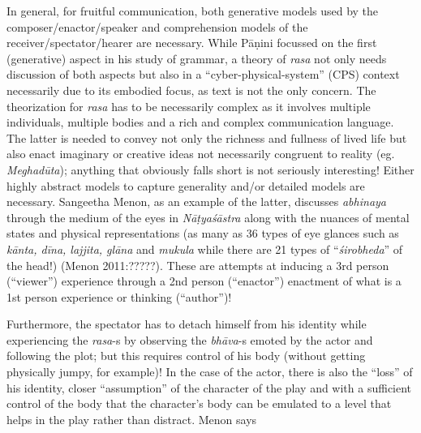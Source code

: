 In general, for fruitful communication, both generative models used by the composer/enactor/speaker and comprehension models of the receiver/spectator/hearer are necessary. While Pāṇini focussed on the first (generative) aspect in his study of grammar, a theory of \textsl{rasa} not only needs discussion of both aspects but also in a “cyber-physical-system” (CPS) context necessarily due to its embodied focus, as text is not the only concern. The theorization for \textsl{rasa} has to be necessarily complex as it involves multiple individuals, multiple bodies and a rich and complex communication language. The latter is needed to convey not only the richness and fullness of lived life but also enact imaginary or creative ideas not necessarily congruent to reality (eg. \textsl{Meghadūta}); anything that obviously falls short is not seriously interesting! Either highly abstract models to capture generality and/or detailed models are necessary. Sangeetha Menon, as an example of the latter, discusses \textsl{abhinaya} through the medium of the eyes in \textsl{Nāṭyaśāstra} along with the nuances of mental states and physical representations (as many as 36 types of eye glances such as \textsl{kānta, dīna, lajjita, glāna} and \textsl{mukula} while there are 21 types of “\textsl{śirobheda}” of the head!) (Menon 2011:?????). These are attempts at inducing a 3rd person (“viewer”) experience through a 2nd person (“enactor”) enactment of what is a 1st person experience or thinking (“author”)!

Furthermore, the spectator has to detach himself from his identity while experiencing the \textsl{rasa}-s by observing the \textsl{bhāva}-s emoted by the actor and following the plot; but this requires control of his body (without getting physically jumpy, for example)! In the case of the actor, there is also the “loss” of his identity, closer “assumption” of the character of the play and with a sufficient control of the body that the character’s body can be emulated to a level that helps in the play rather than distract. Menon says 

